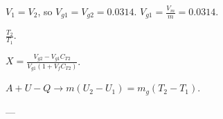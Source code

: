 \( V_1 = V_2 \), so \( V_{g1} = V_{g2} = 0.0314 \).  
\( V_{g1} = \frac{V_m}{m} = 0.0314 \).  

\( \frac{T_2}{T_1} \).  

\( X = \frac{V_{g2} - V_{g1}C_{T2}}{V_{g1}(1 + V_{f}C_{T2})} \).  

\( A + U - Q \rightarrow m(U_2 - U_1) = m_{g}(T_2 - T_1) \).  

---